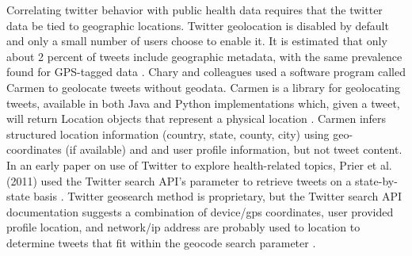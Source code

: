 \documentclass[sigconf]{acmart}
\begin{document}
Correlating twitter behavior with public health data requires that the twitter 
data be tied to geographic locations. Twitter geolocation is disabled by 
default and only a small number of users choose to enable it. It is estimated 
that only about 2 percent of tweets include geographic metadata, with the 
same prevalence found for GPS-tagged data \cite{chary17, leetaru13}. 
Chary and colleagues used a software program called Carmen to geolocate tweets 
without geodata. Carmen is a library for geolocating tweets, available in both 
Java and Python implementations which, given a tweet, will return Location 
objects that represent a physical location \cite{dredze13}. Carmen infers 
structured location information (country, state, county, city) using geo-
coordinates (if available) and and user profile information, but not tweet 
content. In an early paper on use of Twitter to explore health-related topics, 
Prier et al. (2011) used the Twitter search API’s parameter to retrieve tweets 
on a state-by-state basis \cite{prier11}. Twitter geosearch method is 
proprietary, but the Twitter search API documentation suggests a 
combination of device/gps coordinates, user provided profile location, and 
network/ip address are probably used to location to determine tweets that fit 
within the geocode search parameter \cite{twitterGet}.

\end{document}
